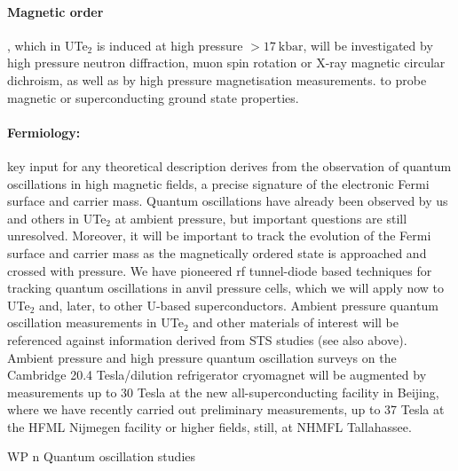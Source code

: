 \paragraph{Magnetic order}, which in UTe$_2$ is induced at high pressure $>\SI{17}{\kilo\bar}$, will be investigated by high pressure neutron diffraction, muon spin rotation or X-ray magnetic circular dichroism, as well as by high pressure magnetisation measurements.  to probe magnetic or superconducting ground state properties. 
\paragraph{Fermiology:}
key input for any
theoretical description derives from the observation of quantum oscillations in high magnetic fields, a precise signature of the electronic Fermi surface and
carrier mass. Quantum oscillations have already been observed by us and others in UTe$_2$ at ambient pressure, but important questions are still unresolved. Moreover, it will be important to track the evolution of the Fermi surface and carrier mass as the magnetically ordered state is approached and crossed with pressure. We have pioneered rf tunnel-diode based techniques for tracking quantum oscillations in anvil pressure cells, which we will apply now to UTe$_2$ and, later, to other U-based superconductors. Ambient pressure quantum oscillation measurements in UTe$_2$ and other materials of interest will be referenced against information derived from STS studies (see also above).
Ambient pressure and high pressure quantum oscillation surveys on the Cambridge 20.4 Tesla/dilution refrigerator cryomagnet will be augmented by measurements up to 30 Tesla at the new all-superconducting facility in Beijing, where we have recently carried out preliminary measurements, up to 37 Tesla at the HFML Nijmegen facility or higher fields, still, at NHMFL Tallahassee. 
 
WP n Quantum oscillation studies 

